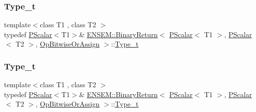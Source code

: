 \subsubsection{\texorpdfstring{Type\_t}{Type\_t}\hspace{0.1cm}{\footnotesize\ttfamily [1/3]}}
{\footnotesize\ttfamily template$<$class T1 , class T2 $>$ \\
typedef \mbox{\hyperlink{classENSEM_1_1PScalar}{P\+Scalar}}$<$T1$>$\& \mbox{\hyperlink{structENSEM_1_1BinaryReturn}{E\+N\+S\+E\+M\+::\+Binary\+Return}}$<$ \mbox{\hyperlink{classENSEM_1_1PScalar}{P\+Scalar}}$<$ T1 $>$, \mbox{\hyperlink{classENSEM_1_1PScalar}{P\+Scalar}}$<$ T2 $>$, \mbox{\hyperlink{structENSEM_1_1OpBitwiseOrAssign}{Op\+Bitwise\+Or\+Assign}} $>$\+::\mbox{\hyperlink{structENSEM_1_1BinaryReturn_3_01PScalar_3_01T1_01_4_00_01PScalar_3_01T2_01_4_00_01OpBitwiseOrAssign_01_4_ab7df9b27d57d2e8f2e5ba5d5354709bd}{Type\+\_\+t}}}

\mbox{\label{structENSEM_1_1BinaryReturn_3_01PScalar_3_01T1_01_4_00_01PScalar_3_01T2_01_4_00_01OpBitwiseOrAssign_01_4_ab7df9b27d57d2e8f2e5ba5d5354709bd}} 
\subsubsection{\texorpdfstring{Type\_t}{Type\_t}\hspace{0.1cm}{\footnotesize\ttfamily [2/3]}}
{\footnotesize\ttfamily template$<$class T1 , class T2 $>$ \\
typedef \mbox{\hyperlink{classENSEM_1_1PScalar}{P\+Scalar}}$<$T1$>$\& \mbox{\hyperlink{structENSEM_1_1BinaryReturn}{E\+N\+S\+E\+M\+::\+Binary\+Return}}$<$ \mbox{\hyperlink{classENSEM_1_1PScalar}{P\+Scalar}}$<$ T1 $>$, \mbox{\hyperlink{classENSEM_1_1PScalar}{P\+Scalar}}$<$ T2 $>$, \mbox{\hyperlink{structENSEM_1_1OpBitwiseOrAssign}{Op\+Bitwise\+Or\+Assign}} $>$\+::\mbox{\hyperlink{structENSEM_1_1BinaryReturn_3_01PScalar_3_01T1_01_4_00_01PScalar_3_01T2_01_4_00_01OpBitwiseOrAssign_01_4_ab7df9b27d57d2e8f2e5ba5d5354709bd}{Type\+\_\+t}}}

